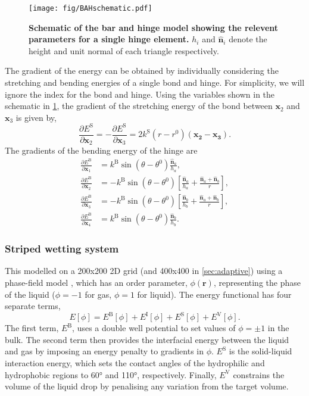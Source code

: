 \documentclass[twocolumn,10pt]{revtex4}
\newcommand{\bm}[1]{\boldsymbol{\mathbf{#1}}}
\begin{document}
\begin{figure}[htb]
  \texttt{[image: fig/BAHschematic.pdf]}
  \caption{\label{fig:BAHschematic}
    \textbf{Schematic of the bar and hinge model showing the relevent parameters for a single hinge element.}
    $h_i$ and $\bm{\hat{n}}_i$ denote the height and unit normal of each triangle respectively.
  }
\end{figure}
The gradient of the energy can be obtained by individually considering the stretching and bending energies of a single bond and hinge.
For simplicity, we will ignore the index for the bond and hinge.
Using the variables shown in the schematic in \cref{fig:BAHschematic}, the gradient of the stretching energy of the bond between $\bm{x}_2$ and $\bm{x}_3$ is given by,
\begin{equation}
  \frac{\partial E^\mathrm{S}}{\partial \bm{x}_2} = - \frac{\partial E^\mathrm{S}}{\partial \bm{x}_3} =
    2 k^\mathrm{S} (r - r^0) (\bm{x_2} - \bm{x_3}).
\end{equation}
The gradients of the bending energy of the hinge are
\begin{align}
  \frac{\partial E^\mathrm{B}}{\partial \bm{x}_1} &= k^\mathrm{B} \sin(\theta - \theta^0) \frac{\bm{\hat{n}}_a}{h_a}, \\
  \frac{\partial E^\mathrm{B}}{\partial \bm{x}_2} &= - k^\mathrm{B} \sin(\theta - \theta^0) \left[\frac{\bm{\hat{n}}_a}{h_a} + \frac{\bm{\hat{n}}_a + \bm{\hat{n}}_b}{r}\right], \\
  \frac{\partial E^\mathrm{B}}{\partial \bm{x}_3} &= - k^\mathrm{B} \sin(\theta - \theta^0) \left[\frac{\bm{\hat{n}}_b}{h_b} + \frac{\bm{\hat{n}}_a + \bm{\hat{n}}_b}{r}\right], \\
  \frac{\partial E^\mathrm{B}}{\partial \bm{x}_4} &= k^\mathrm{B} \sin(\theta - \theta^0) \frac{\bm{\hat{n}}_b}{h_b}.
\end{align}

\subsubsection{Striped wetting system}
This modelled on a 200x200 2D grid (and 400x400 in \cref{sec:adaptive}) using a phase-field model \cite{Panter2019b}, which has an order parameter, $\phi(\bm{r})$, representing the phase of the liquid ($\phi=-1$ for gas, $\phi=1$ for liquid).
The energy functional has four separate terms,
\begin{equation} \label{eq:phasefield}
  E[\phi] = E^\mathrm{B}[\phi] + E^\mathrm{I}[\phi] + E^\mathrm{S}[\phi] + E^\mathrm{V}[\phi].
\end{equation}
The first term, $E^\mathrm{B}$, uses a double well potential to set values of $\phi=\pm1$ in the bulk.
The second term then provides the interfacial energy between the liquid and gas by imposing an energy penalty to gradients in $\phi$.
$E^\mathrm{S}$ is the solid-liquid interaction energy, which sets the contact angles of the hydrophilic and hydrophobic regions to 60\si{\degree} and 110\si{\degree}, respectively.
Finally, $E^\mathrm{V}$ constrains the volume of the liquid drop by penalising any variation from the target volume.
\end{document}
